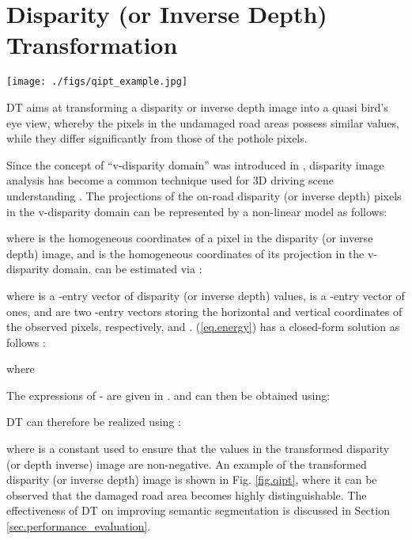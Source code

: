 \documentclass[runningheads]{llncs}
\begin{document}
\section{Disparity (or Inverse Depth) Transformation}
\label{sec.quasi_dense_inverse_perspective}

\begin{figure*}[t]
    \centering
    \texttt{[image: ./figs/qipt\_example.jpg]}
    \caption{Disparity transformation: (a) RGB image; (b) disparity image produced by PT-SRP \cite{fan2018road}; and (c) transformed disparity image.}
    \label{fig.qipt}
\end{figure*}

DT aims at transforming a disparity or inverse depth image  into a quasi bird's eye view, whereby the pixels in the undamaged road areas possess similar values, while they differ significantly from those of the pothole pixels.

Since the concept of ``v-disparity domain'' was introduced in \cite{labayrade2003single}, disparity image analysis has become a common technique used for 3D driving scene understanding \cite{fan2019real}. The projections of the on-road disparity (or inverse depth) pixels in the v-disparity domain can be represented by a non-linear model as follows:

where  is the homogeneous coordinates of a pixel in the disparity (or inverse depth) image, and  is the homogeneous coordinates of its projection in the v-disparity domain.  can be estimated via \cite{fan2019real}:

where  is a -entry vector of disparity (or inverse depth) values,  is a -entry vector of ones,  and  are two -entry vectors storing the horizontal and vertical coordinates of the observed pixels, respectively, and .  (\ref{eq.energy}) has a closed-form solution as follows \cite{fan2019road}:

where

The expressions of - are given in \cite{fan2019road}.  and  can then be obtained using:

DT can therefore be realized using \cite{fan2019road}:

where  is a constant used to ensure that the values in the transformed disparity (or depth inverse) image  are non-negative.
An example of the transformed disparity (or inverse depth) image is shown in Fig. \ref{fig.qipt}, where it can be observed that the damaged road area becomes highly distinguishable. The effectiveness of DT on improving semantic segmentation is discussed in Section \ref{sec.performance_evaluation}.
\end{document}
